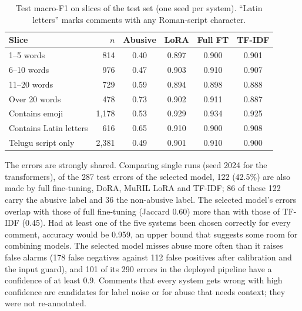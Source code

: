 \documentclass{svproc}
\begin{document}
\begin{table}[t]
\caption{Test macro-F1 on slices of the test set (one seed per system). ``Latin letters'' marks comments with any Roman-script character.}
\label{tab:slices}
\centering
\footnotesize
\setlength{\tabcolsep}{4pt}
\begin{tabular}{lrcccc}
\toprule
Slice & $n$ & Abusive & LoRA & Full FT & TF-IDF \\
\midrule
1--5 words & 814 & 0.40 & 0.897 & 0.900 & 0.901 \\
6--10 words & 976 & 0.47 & 0.903 & 0.910 & 0.907 \\
11--20 words & 729 & 0.59 & 0.894 & 0.898 & 0.888 \\
Over 20 words & 478 & 0.73 & 0.902 & 0.911 & 0.887 \\
Contains emoji & 1,178 & 0.53 & 0.929 & 0.934 & 0.925 \\
Contains Latin letters & 616 & 0.65 & 0.910 & 0.900 & 0.908 \\
Telugu script only & 2,381 & 0.49 & 0.901 & 0.910 & 0.900 \\
\bottomrule
\end{tabular}
\end{table}

The errors are strongly shared. Comparing single runs (seed 2024 for the transformers), of the 287 test errors of the selected model, 122 (42.5\%) are also made by full fine-tuning, DoRA, MuRIL LoRA and TF-IDF; 86 of these 122 carry the abusive label and 36 the non-abusive label. The selected model's errors overlap with those of full fine-tuning (Jaccard 0.60) more than with those of TF-IDF (0.45). Had at least one of the five systems been chosen correctly for every comment, accuracy would be 0.959, an upper bound that suggests some room for combining models. The selected model misses abuse more often than it raises false alarms (178 false negatives against 112 false positives after calibration and the input guard), and 101 of its 290 errors in the deployed pipeline have a confidence of at least 0.9. Comments that every system gets wrong with high confidence are candidates for label noise or for abuse that needs context; they were not re-annotated.
\end{document}
